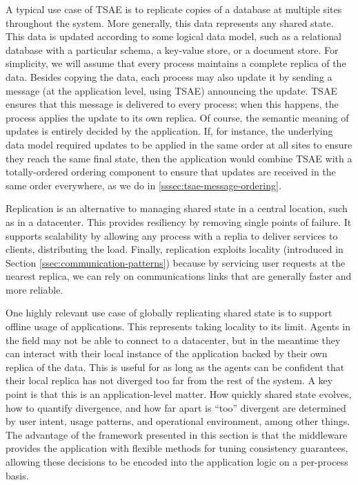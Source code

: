 \documentclass[]             %
{NASA}                       %
\theoremstyle{definition}
\begin{document}
A typical use case of TSAE is to replicate copies of a database at
multiple sites throughout the system. More generally, this data
represents any shared state. This data is updated according to some
logical data model, such as a relational database with a particular
schema, a key-value store, or a document store. For simplicity, we
will assume that every process maintains a complete replica of the
data. Besides copying the data, each process may also update it by
sending a message (at the application level, using TSAE) announcing
the update. TSAE ensures that this message is delivered to every
process; when this happens, the process applies the update to its own
replica. Of course, the semantic meaning of updates is entirely
decided by the application. If, for instance, the underlying data
model required updates to be applied in the same order at all sites to
ensure they reach the same final state, then the application would
combine TSAE with a totally-ordered ordering component to ensure that
updates are received in the same order everywhere, as we do in
\ref{sssec:tsae-message-ordering}.

Replication is an alternative to managing shared state in a central
location, such as in a datacenter. This provides resiliency by
removing single points of failure. It supports scalability by allowing
any process with a replia to deliver services to clients, distributing
the load. Finally, replication exploits locality (introduced in
Section \ref{ssec:communication-patterns}) because by servicing user
requests at the nearest replica, we can rely on communications links
that are generally faster and more reliable.

One highly relevant use case of globally replicating shared state is
to support offline usage of applications. This represents taking
locality to its limit. Agents in the field may not be able to connect
to a datacenter, but in the meantime they can interact with their
local instance of the application backed by their own replica of the
data. This is useful for as long as the agents can be confident that
their local replica has not diverged too far from the rest of the
system. A key point is that this is an application-level matter. How
quickly shared state evolves, how to quantify divergence, and how far
apart is ``too'' divergent are determined by user intent, usage
patterns, and operational environment, among other things. The
advantage of the framework presented in this section is that the
middleware provides the application with flexible methods for tuning
consistency guarantees, allowing these decisions to be encoded into
the application logic on a per-process basis.
\end{document}
